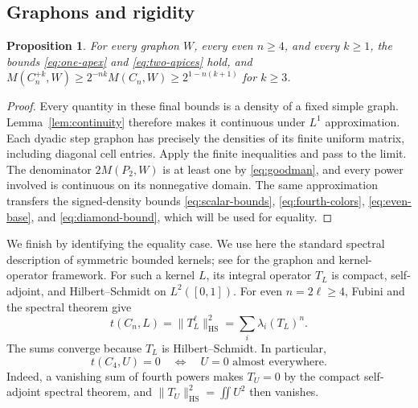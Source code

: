 \documentclass[11pt,a4paper]{article}
\newtheorem{proposition}[theorem]{Proposition}
\theoremstyle{remark}
\numberwithin{equation}{section}
\newcommand{\HS}{\mathrm{HS}}
\begin{document}
\subsection{Graphons and rigidity}

\begin{proposition}\label{prop:graphon-bounds}
For every graphon $W$, every even $n\geq4$, and every $k\geq1$,
the bounds \eqref{eq:one-apex} and \eqref{eq:two-apices} hold,
and $M(C_n^{+k},W)\geq2^{-nk}M(C_n,W)\geq2^{1-n(k+1)}$
for $k\geq3$.
\end{proposition}
\begin{proof}
Every quantity in these final bounds is a density of a fixed
simple graph. Lemma~\ref{lem:continuity} therefore makes it
continuous under $L^1$ approximation. Each dyadic step graphon
has precisely the densities of its finite uniform matrix,
including diagonal cell entries. Apply the finite inequalities
and pass to the limit. The denominator $2M(P_2,W)$ is at least
one by \eqref{eq:goodman}, and every power involved is continuous
on its nonnegative domain. The same approximation transfers the
signed-density bounds \eqref{eq:scalar-bounds},
\eqref{eq:fourth-colors}, \eqref{eq:even-base}, and
\eqref{eq:diamond-bound}, which will be used for equality.
\end{proof}

We finish by identifying the equality case. We use here the
standard spectral description of symmetric bounded kernels;
see \cite{Lovasz} for the graphon and kernel-operator framework.
For such a kernel $L$, its integral operator $T_L$ is compact,
self-adjoint, and Hilbert--Schmidt on $L^2([0,1])$.
For even $n=2\ell\geq4$, Fubini and the spectral theorem give
\begin{equation}\label{eq:infinite-trace}
 t(C_n,L)=\|T_L^\ell\|_\HS^2
          =\sum_i\lambda_i(T_L)^n.
\end{equation}
The sums converge because $T_L$ is Hilbert--Schmidt.
In particular,
\begin{equation}\label{eq:c-zero}
 t(C_4,U)=0\quad\Longleftrightarrow\quad
 U=0\text{ almost everywhere}.
\end{equation}
Indeed, a vanishing sum of fourth powers makes $T_U=0$ by the
compact self-adjoint spectral theorem, and
$\|T_U\|_\HS^2=\iint U^2$ then vanishes.
\end{document}
